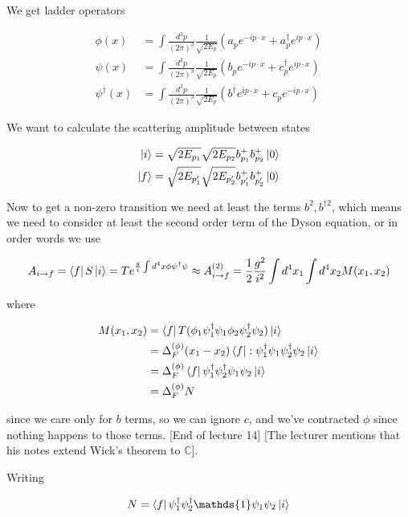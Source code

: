 \documentclass{article}
\theoremstyle{definition}
\begin{document}
We get ladder operators

\begin{align*}
  \phi(x) &= \int \frac{d^3p}{(2\pi)^3} \frac{1}{\sqrt{2 E_p}} (a_p e^{-ip \cdot x} + a^\dagger_p e^{ip \cdot x}) \\
  \psi(x) &= \int \frac{d^3p}{(2\pi)^3} \frac{1}{\sqrt{2 E_p}} (b_p e^{-ip \cdot x} + c^\dagger_p e^{ip \cdot x}) \\
  \psi^\dagger(x) &= \int \frac{d^3p}{(2\pi)^3} \frac{1}{\sqrt{2E_p}} (b^\dagger e^{ip \cdot x} + c_p e^{-i p \cdot x})
\end{align*}

We want to calculate the scattering amplitude between states

\begin{align*}
  \ket{i} &= \sqrt{2E_{p_1}} \sqrt{2E_{p_2}} b_{p_1}^+ b_{p_2}^+ \ket{0} \\
  \ket{f} &= \sqrt{2E_{p_1'}} \sqrt{2E_{p_2'}} b_{p_1'}^+ b_{p_2'}^+ \ket{0}
\end{align*}

Now to get a non-zero transition we need at least the terms $b^2, b^{\dagger
  2}$, which means we need to consider at least the second order term of the
Dyson equation, or in order words we use

$$ A_{i \to f} = \bra{f} S \ket{i} = T e^{\frac{g}{i} \int d^4 x \phi
  \psi^\dagger \psi} \approx A_{i \to f}^{(2)} = \frac{1}{2} \frac{g^2}{i^2}
\int d^4 x_1 \int d^4 x_2 M(x_1, x_2) $$

where

\begin{align*}
  M(x_1, x_2) &= \bra{f} T(\phi_1 \psi_1^\dagger \psi_1 \phi_2 \psi_2^\dagger \psi_2) \ket{i} \\
              &= \Delta_F^{(\phi)}(x_1 - x_2) \bra{f} : \psi_1^\dagger \psi_1 \psi_2^\dagger \psi_2 \ket{i} \\
              &= \Delta_F^{(\phi)} \bra{f} \psi_1^\dagger \psi_2^\dagger \psi_1 \psi_2 \ket{i} \\
              &= \Delta_F^{(\phi)} N
\end{align*}

since we care only for $b$ terms, so we can ignore $c$, and we've contracted
$\phi$ since nothing happens to those terms. [End of lecture 14] [The lecturer
mentions that his notes extend Wick's theorem to $\mathbb{C}$].

Writing

$$ N = \bra{f} \psi_1^\dagger \psi_2^\dagger \mathds{1} \psi_1 \psi_2 \ket{i} $$
\end{document}
